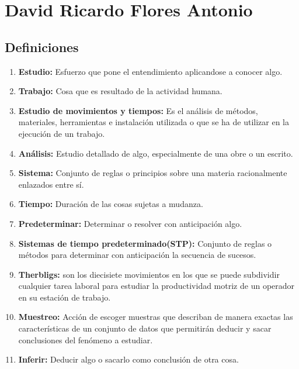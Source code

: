\section{David Ricardo Flores Antonio}
\subsection{Definiciones}

\begin{enumerate}
    \item \textbf{Estudio:} Esfuerzo que pone el entendimiento aplicandose a conocer algo.
    \item \textbf{Trabajo:} Cosa que es resultado de la actividad humana.
    \item \textbf{Estudio de movimientos y tiempos:} Es el análisis de métodos, materiales, herramientas e instalación utilizada o que se ha de utilizar en la ejecución de un trabajo.
    \item \textbf{Análisis:} Estudio detallado de algo, especialmente de una obre o un escrito.
    \item \textbf{Sistema:} Conjunto de reglas o principios sobre una materia racionalmente enlazados entre sí.
    \item \textbf{Tiempo:} Duración de las cosas sujetas a mudanza.
    \item \textbf{Predeterminar:} Determinar o resolver con anticipación algo.
    \item \textbf{Sistemas de tiempo predeterminado(STP):} Conjunto de reglas o métodos para determinar con anticipación la secuencia de sucesos.
    \item \textbf{Therbligs:} son los diecisiete movimientos en los que se puede subdividir cualquier tarea laboral para estudiar la productividad motriz de un operador en su estación de trabajo.
    \item \textbf{Muestreo:} Acción de escoger muestras que describan de manera exactas las características de un conjunto de datos que permitirán deducir y sacar conclusiones del fenómeno a estudiar.
    \item \textbf{Inferir:} Deducir algo o sacarlo como conclusión de otra cosa.
\end{enumerate}